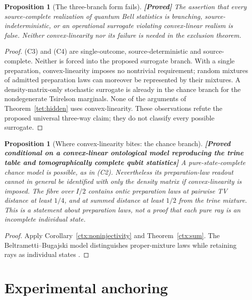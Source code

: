 \documentclass[11pt,a4paper]{article}
\newtheorem{proposition}[theorem]{Proposition}
\theoremstyle{definition}
\theoremstyle{remark}\newtheorem{remark}[theorem]{Remark}
\newcommand{\status}[1]{\textbf{[#1]}\quad}
\begin{document}
\begin{proposition}[The three-branch form fails]\label{tet:trilemmafails}
\status{Proved}
The assertion that every source-complete realization of quantum Bell statistics is branching, source-indeterministic, or an operational surrogate violating convex-linear realism is false. Neither convex-linearity nor its failure is needed in the exclusion theorem.
\end{proposition}
\begin{proof}
(C3) and (C4) are single-outcome, source-deterministic and source-complete. Neither is forced into the proposed surrogate branch. With a single preparation, convex-linearity imposes no nontrivial requirement; random mixtures of admitted preparation laws can moreover be represented by their mixtures. A density-matrix-only stochastic surrogate is already in the chance branch for the nondegenerate Tsirelson marginals. None of the arguments of Theorem~\ref{tet:hidden} uses convex-linearity. These observations refute the proposed universal three-way claim; they do not classify every possible surrogate.
\end{proof}

\begin{proposition}[Where convex-linearity bites: the chance branch]\label{tet:chance}
\status{Proved conditional on a convex-linear ontological model reproducing the trine table and tomographically complete qubit statistics}
A pure-state-complete chance model is possible, as in (C2). Nevertheless its preparation-law readout cannot in general be identified with only the density matrix if convex-linearity is imposed. The fibre over $I/2$ contains ontic preparation laws at pairwise TV distance at least $1/4$, and at summed distance at least $1/2$ from the trine mixture. This is a statement about preparation laws, not a proof that each pure ray is an incomplete individual state.
\end{proposition}
\begin{proof}
Apply Corollary~\ref{ctx:noninjectivity} and Theorem~\ref{ctx:sum}. The Beltrametti--Bugajski model distinguishes proper-mixture laws while retaining rays as individual states \cite{BB95}.
\end{proof}

\section{Experimental anchoring}\label{exp:section}
\end{document}

